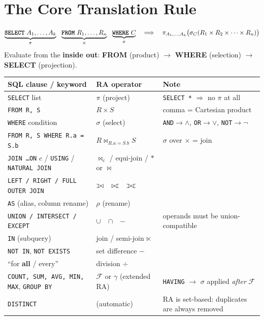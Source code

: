 \documentclass[10pt,a4paper]{article}
\def\ojoin{\setbox0=\hbox{$\bowtie$}\rule[-.02ex]{.25em}{.4pt}\llap{\rule[\ht0]{.25em}{.4pt}}}
\def\lojoin{\mathbin{\ojoin\mkern-5.8mu\bowtie}}
\def\rojoin{\mathbin{\bowtie\mkern-5.8mu\ojoin}}
\def\fojoin{\mathbin{\ojoin\mkern-5.8mu\bowtie\mkern-5.8mu\ojoin}}
\newcommand{\agg}{\mathcal{F}}            %
\newcommand{\sqlkw}[1]{\textbf{\texttt{#1}}}
\begin{document}
\section{The Core Translation Rule}

\begin{keybox}
\[
\underbrace{\sqlkw{SELECT}\ A_1,\dots,A_k}_{\pi}\ \ \underbrace{\sqlkw{FROM}\ R_1,\dots,R_n}_{\times}\ \ \underbrace{\sqlkw{WHERE}\ C}_{\sigma}
\quad\Longrightarrow\quad
\pi_{A_1,\dots,A_k}\big(\sigma_{C}(R_1 \times R_2 \times \dots \times R_n)\big)
\]
Evaluate from the \textbf{inside out}: \textbf{FROM} (product) $\rightarrow$ \textbf{WHERE} (selection) $\rightarrow$ \textbf{SELECT} (projection).
\end{keybox}

\begin{tabularx}{\linewidth}{@{}l l X@{}}
\toprule
\textbf{SQL clause / keyword} & \textbf{RA operator} & \textbf{Note}\\\midrule
\texttt{SELECT} list & $\pi$ (project) & \texttt{SELECT *} $\Rightarrow$ no $\pi$ at all\\
\texttt{FROM R, S} & $R \times S$ & comma = Cartesian product\\
\texttt{WHERE} condition & $\sigma$ (select) & \texttt{AND}$\to\wedge$, \texttt{OR}$\to\vee$, \texttt{NOT}$\to\neg$\\
\texttt{FROM R, S WHERE R.a = S.b} & $R \bowtie_{R.a=S.b} S$ & $\sigma$ over $\times$ = join\\
\texttt{JOIN \dots ON} $c$ / \texttt{USING} / \texttt{NATURAL JOIN} & $\bowtie_c$ / equi-join / $*$ or $\bowtie$ & \\
\texttt{LEFT / RIGHT / FULL OUTER JOIN} & $\lojoin$\ \ $\rojoin$\ \ $\fojoin$ & \\
\texttt{AS} (alias, column rename) & $\rho$ (rename) & \\
\texttt{UNION / INTERSECT / EXCEPT} & $\cup$\ \ $\cap$\ \ $-$ & operands must be union-compatible\\
\texttt{IN} (subquery) & join / semi-join $\ltimes$ & \\
\texttt{NOT IN}, \texttt{NOT EXISTS} & set difference $-$ & \\
``for \textbf{all} / every'' & division $\div$ & \\
\texttt{COUNT, SUM, AVG, MIN, MAX}, \texttt{GROUP BY} & $\agg$ or $\gamma$ (extended RA) & \texttt{HAVING} $\to$ $\sigma$ applied \emph{after} $\agg$\\
\texttt{DISTINCT} & (automatic) & RA is set-based: duplicates are always removed\\
\bottomrule
\end{tabularx}
\end{document}
